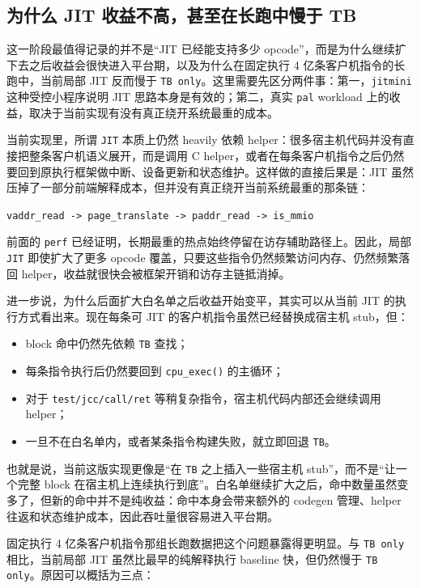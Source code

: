\documentclass[a4paper]{article}
\begin{document}
\subsection{为什么 JIT 收益不高，甚至在长跑中慢于 TB}
这一阶段最值得记录的并不是“JIT 已经能支持多少 opcode”，而是为什么继续扩下去之后收益会很快进入平台期，以及为什么在固定执行 4 亿条客户机指令的长跑中，当前局部 JIT 反而慢于 \texttt{TB only}。这里需要先区分两件事：第一，\texttt{jitmini} 这种受控小程序说明 JIT 思路本身是有效的；第二，真实 \texttt{pal} workload 上的收益，取决于当前实现有没有真正绕开系统最重的成本。

当前实现里，所谓 \texttt{JIT} 本质上仍然 heavily 依赖 helper：很多宿主机代码并没有直接把整条客户机语义展开，而是调用 C helper，或者在每条客户机指令之后仍然要回到原执行框架做中断、设备更新和状态维护。这样做的直接后果是：JIT 虽然压掉了一部分前端解释成本，但并没有真正绕开当前系统最重的那条链：

\begin{center}
\texttt{vaddr\_read -> page\_translate -> paddr\_read -> is\_mmio}
\end{center}

前面的 \texttt{perf} 已经证明，长期最重的热点始终停留在访存辅助路径上。因此，局部 \texttt{JIT} 即使扩大了更多 opcode 覆盖，只要这些指令仍然频繁访问内存、仍然频繁落回 helper，收益就很快会被框架开销和访存主链抵消掉。

进一步说，为什么后面扩大白名单之后收益开始变平，其实可以从当前 JIT 的执行方式看出来。现在每条可 JIT 的客户机指令虽然已经替换成宿主机 stub，但：

\begin{itemize}
  \item block 命中仍然先依赖 \texttt{TB} 查找；
  \item 每条指令执行后仍然要回到 \texttt{cpu\_exec()} 的主循环；
  \item 对于 \texttt{test/jcc/call/ret} 等稍复杂指令，宿主机代码内部还会继续调用 helper；
  \item 一旦不在白名单内，或者某条指令构建失败，就立即回退 \texttt{TB}。
\end{itemize}

也就是说，当前这版实现更像是“在 \texttt{TB} 之上插入一些宿主机 stub”，而不是“让一个完整 block 在宿主机上连续执行到底”。白名单继续扩大之后，命中数量虽然变多了，但新的命中并不是纯收益：命中本身会带来额外的 codegen 管理、helper 往返和状态维护成本，因此吞吐量很容易进入平台期。

固定执行 4 亿条客户机指令那组长跑数据把这个问题暴露得更明显。与 \texttt{TB only} 相比，当前局部 JIT 虽然比最早的纯解释执行 baseline 快，但仍然慢于 \texttt{TB only}。原因可以概括为三点：
\end{document}
